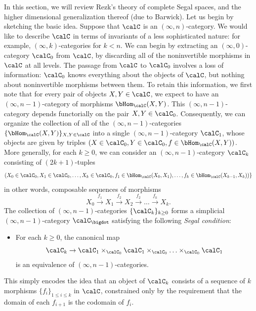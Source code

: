 In this section, we will review Rezk's theory of complete Segal spaces, and the higher dimensional generalization thereof (due to Barwick). Let us begin by sketching the basic idea. Suppose
that $\calC$ is an $(\infty,n)$-category. We would like to describe $\calC$ in terms of
invariants of a less sophisticated nature: for example, $(\infty,k)$-categories for $k < n$.
We can begin by extracting an $(\infty,0)$-category $\calC_0$ from $\calC$, by 
discarding all of the noninvertible morphisms in $\calC$ at all levels.
The passage from $\calC$ to $\calC_0$ involves a loss of information:
$\calC_0$ knows everything about the objects of $\calC$, but nothing about
noninvertible morphisms between them. To retain this information, we first note that
for every pair of objects $X,Y \in \calC$, we expect to have an $(\infty,n-1)$-category
of morphisms $\bHom_{\calC}(X,Y)$. This $(\infty,n-1)$-category depends functorially
on the pair $X,Y \in \calC_0$. Consequently, we can organize the collection
of all of the $(\infty,n-1)$-categories $\{ \bHom_{\calC}(X,Y) \}_{X,Y \in \calC}$ into
a single $(\infty,n-1)$-category $\calC_1$, whose objects are given by triples
$(X \in \calC_0, Y \in \calC_0, f \in \bHom_{\calC}(X,Y) )$.
More generally, for each $k \geq 0$, we can consider an
$(\infty,n-1)$-category $\calC_k$ consisting of $(2k+1)$-tuples
$$ (X_0 \in \calC_0, X_1 \in \calC_0, \ldots, X_k \in \calC_0,
f_1 \in \bHom_{\calC}(X_0, X_1), \ldots, f_k \in \bHom_{\calC}( X_{k-1}, X_k)) \}$$
in other words, composable sequences of morphisms
$$ X_0 \stackrel{f_1}{\rightarrow} X_1 \stackrel{f_2}{\rightarrow} X_2 \stackrel{f_2}{\rightarrow} \ldots \stackrel{f_k}{\rightarrow} X_k.$$
The collection of $(\infty,n-1)$-categories $\{ \calC_{k} \}_{k \geq 0}$ forms a simplicial
$(\infty,n-1)$-category $\calC_{\bigdot}$ satisfying the following {\it Segal condition}:
\begin{itemize}
\item[$(A1)$] For each $k \geq 0$, the canonical map $$\calC_{k} \rightarrow
\calC_1 \times_{\calC_0} \calC_1 \times_{\calC_0} \ldots
\times_{\calC_0} \calC_1$$ is an equivalence of $(\infty,n-1)$-categories.
\end{itemize}
This simply encodes the idea that an object of $\calC_{k}$ consists of a sequence
of $k$ morphisms $\{ f_i \}_{1 \leq i \leq k}$ in $\calC$, constrained only by the requirement that the domain of each $f_{i+1}$ is the codomain of $f_i$.

